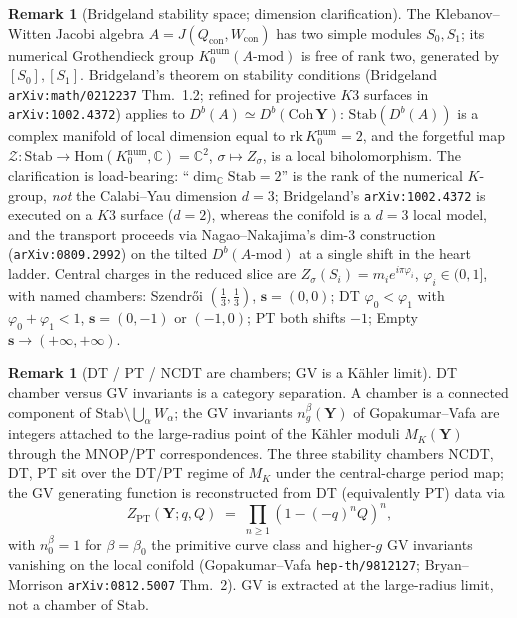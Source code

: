 \documentclass[11pt]{amsart}
\theoremstyle{definition}
\newtheorem{remark}[theorem]{Remark}
\providecommand{\bY}{\mathbf{Y}}
\providecommand{\Hom}{\mathrm{Hom}}
\providecommand{\bC}{\mathbb{C}}
\begin{document}
\begin{remark}[Bridgeland stability space; dimension clarification]
\label{rem:bridgeland-stab}
The Klebanov--Witten Jacobi algebra $A = J(Q_{\mathrm{con}},
W_{\mathrm{con}})$ has two simple modules $S_0, S_1$; its numerical
Grothendieck group $K_0^{\mathrm{num}}(A\text{-mod})$ is free of rank
two, generated by $[S_0], [S_1]$. Bridgeland's theorem on stability
conditions (Bridgeland \texttt{arXiv:math/0212237} Thm.~1.2; refined
for projective $K3$ surfaces in \texttt{arXiv:1002.4372}) applies to
$D^b(A) \simeq D^b(\mathrm{Coh}\,\bY)$: $\mathrm{Stab}(D^b(A))$ is a
complex manifold of local dimension equal to $\mathrm{rk}\,
K_0^{\mathrm{num}} = 2$, and the forgetful map $\mathcal{Z} :
\mathrm{Stab} \to \Hom(K_0^{\mathrm{num}}, \bC) = \bC^2$,
$\sigma \mapsto Z_\sigma$, is a local biholomorphism. The
clarification is load-bearing: ``$\dim_\bC \mathrm{Stab} = 2$'' is
the rank of the numerical $K$-group, \emph{not} the Calabi--Yau
dimension $d = 3$; Bridgeland's \texttt{arXiv:1002.4372} is executed
on a $K3$ surface ($d = 2$), whereas the conifold is a $d = 3$ local
model, and the transport proceeds via Nagao--Nakajima's dim-$3$
construction (\texttt{arXiv:0809.2992}) on the tilted
$D^b(A\text{-mod})$ at a single shift in the heart ladder. Central
charges in the reduced slice are $Z_\sigma(S_i) = m_i e^{i\pi
\varphi_i}$, $\varphi_i \in (0, 1]$, with named chambers: Szendrői
$(\tfrac{1}{3}, \tfrac{1}{3})$, $\mathbf{s} = (0, 0)$; DT $\varphi_0
< \varphi_1$ with $\varphi_0 + \varphi_1 < 1$, $\mathbf{s} = (0, -1)$
or $(-1, 0)$; PT both shifts $-1$; Empty $\mathbf{s} \to (+\infty,
+\infty)$.
\end{remark}

\begin{remark}[DT / PT / NCDT are chambers; GV is a Kähler limit]
\label{rem:chambers-vs-kahler}
DT chamber versus GV invariants is a category separation. A chamber
is a connected component of $\mathrm{Stab} \setminus \bigcup_\alpha
W_\alpha$; the GV invariants $n_g^\beta(\bY)$ of Gopakumar--Vafa are
integers attached to the large-radius point of the Kähler moduli
$M_K(\bY)$ through the MNOP/PT correspondences. The three stability
chambers NCDT, DT, PT sit over the DT/PT regime of $M_K$ under the
central-charge period map; the GV generating function is
reconstructed from DT (equivalently PT) data via
\[
  Z_{\mathrm{PT}}(\bY; q, Q) \;=\; \prod_{n \geq 1} (1 - (-q)^n Q)^n,
\]
with $n_0^\beta = 1$ for $\beta = \beta_0$ the primitive curve class
and higher-$g$ GV invariants vanishing on the local conifold
(Gopakumar--Vafa \texttt{hep-th/9812127}; Bryan--Morrison
\texttt{arXiv:0812.5007} Thm.~2). GV is extracted at the
large-radius limit, not a chamber of $\mathrm{Stab}$.
\end{remark}
\end{document}
